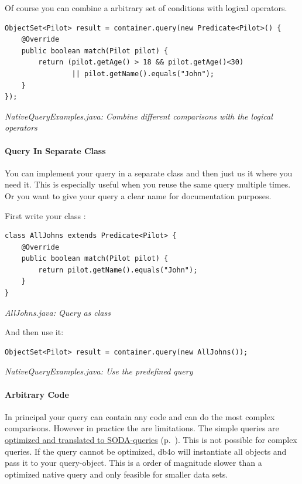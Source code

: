 Of course you can combine a arbitrary set of conditions with logical operators.

\begin{lstlisting}
ObjectSet<Pilot> result = container.query(new Predicate<Pilot>() {
    @Override
    public boolean match(Pilot pilot) {
        return (pilot.getAge() > 18 && pilot.getAge()<30)
                || pilot.getName().equals("John");
    }
});
\end{lstlisting}

{\small\itshape NativeQueryExamples.java: Combine different comparisons with the logical operators\par}
\medskip

\paragraph{Query In Separate Class}
\label{ref:basics-querying-native-queries-native-query-examples:seperatequeryunit}

You can implement your query in a separate class  and then just us it where you need it. This is especially useful when you reuse the same query multiple times. Or you want to give your query a clear name for documentation purposes.

First write your  class :

\begin{lstlisting}
class AllJohns extends Predicate<Pilot> {
    @Override
    public boolean match(Pilot pilot) {
        return pilot.getName().equals("John");
    }
}
\end{lstlisting}

{\small\itshape AllJohns.java: Query as class\par}
\medskip

And then use it:

\begin{lstlisting}
ObjectSet<Pilot> result = container.query(new AllJohns());
\end{lstlisting}

{\small\itshape NativeQueryExamples.java: Use the predefined query\par}
\medskip

\paragraph{Arbitrary Code}
\label{ref:basics-querying-native-queries-native-query-examples:arbitrarycode}

In principal your query can contain any code and can do the most complex comparisons. However in practice the are limitations. The simple queries are \hyperref[ref:basics-querying-native-queries-native-query-optimization]{optimized and translated to SODA-queries} (p.~\pageref{ref:basics-querying-native-queries-native-query-optimization}). This is not possible for complex queries. If the query cannot be optimized, db4o will instantiate all objects and pass it to your query-object. This is a order of magnitude slower than a optimized native query and only feasible for smaller data sets.

